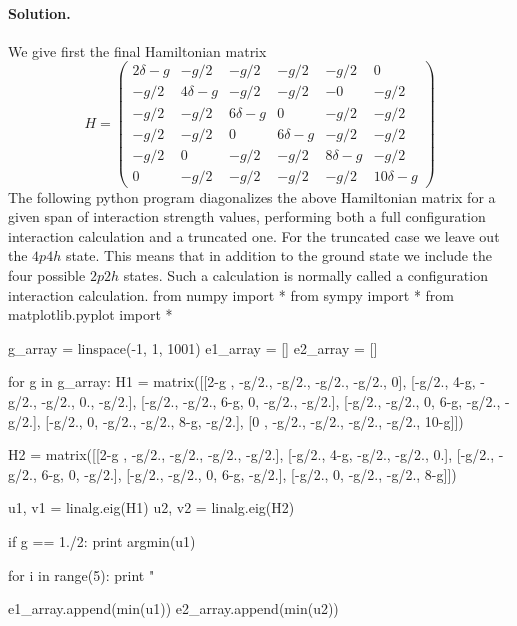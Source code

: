 \documentclass[%
twoside,                 %
final,                   %
10pt]{article}
\newenvironment{doconceexercise}{}{}
\begin{document}
\begin{doconceexercise}
\paragraph{Solution.}
We give first the final Hamiltonian matrix
\[
H = \left ( 
\begin{array}{cccccc}
2\delta -g & -g/2 & -g/2 & -g/2 & -g/2 & 0 \\
 -g/2 & 4\delta -g & -g/2 & -g/2 & -0 & -g/2 \\
-g/2 & -g/2 & 6\delta -g & 0 & -g/2 & -g/2 \\
 -g/2 & -g/2 & 0 & 6\delta-g & -g/2 & -g/2 \\
 -g/2 & 0 & -g/2 & -g/2 & 8\delta-g & -g/2 \\
0 & -g/2 & -g/2 & -g/2 & -g/2 & 10\delta -g 
\end{array} \right )
\]
The following python program diagonalizes the above Hamiltonian matrix for a given span of interaction strength values, performing both a full configuration interaction calculation and a truncated one. For the truncated case we leave out the $4p4h$ state. This means that in addition to the ground state we include the four possible $2p2h$ states. Such a calculation is normally called a configuration interaction calculation. 
\bpypro
from numpy import *
from sympy import *
from matplotlib.pyplot import *

g_array = linspace(-1, 1, 1001)
e1_array = []
e2_array = []

for g in g_array:
	H1 = matrix([[2-g , -g/2.,  -g/2., -g/2., -g/2.,     0], 
		        [-g/2.,   4-g,  -g/2., -g/2.,    0., -g/2.],
		        [-g/2., -g/2.,    6-g,     0, -g/2., -g/2.],
				[-g/2., -g/2.,      0,   6-g, -g/2., -g/2.],
				[-g/2.,     0,  -g/2., -g/2.,   8-g, -g/2.],
				[0    , -g/2.,  -g/2., -g/2., -g/2.,  10-g]]) 

	H2 = matrix([[2-g , -g/2.,  -g/2., -g/2., -g/2.], 
		        [-g/2.,   4-g,  -g/2., -g/2.,    0.],
		        [-g/2., -g/2.,    6-g,     0, -g/2.],
				[-g/2., -g/2.,      0,   6-g, -g/2.],
				[-g/2.,     0,  -g/2., -g/2.,   8-g]]) 

		

	u1, v1 = linalg.eig(H1)
	u2, v2 = linalg.eig(H2)

	if g == 1./2:
		print argmin(u1)

		for i in range(5):
			print " %



	e1_array.append(min(u1))
	e2_array.append(min(u2))



\end{doconceexercise}
\end{document}
